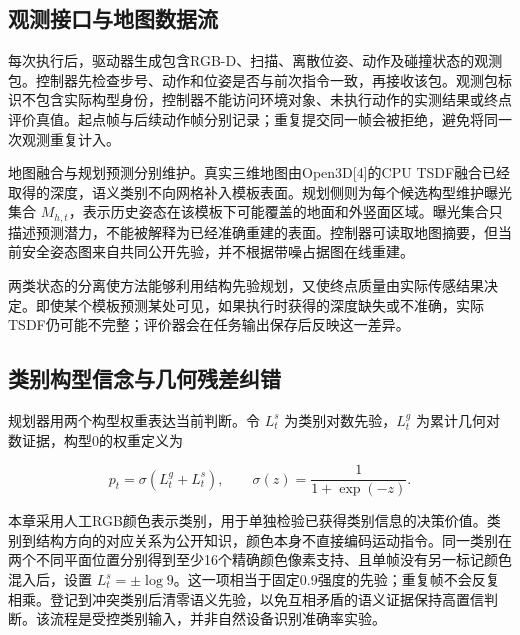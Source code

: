 \documentclass[11pt,a4paper]{article}
\numberwithin{equation}{section}
\begin{document}
\hypertarget{ux89c2ux6d4bux63a5ux53e3ux4e0eux5730ux56feux6570ux636eux6d41}{%
\subsection{观测接口与地图数据流}\label{ux89c2ux6d4bux63a5ux53e3ux4e0eux5730ux56feux6570ux636eux6d41}}

每次执行后，驱动器生成包含RGB-D、扫描、离散位姿、动作及碰撞状态的观测包。控制器先检查步号、动作和位姿是否与前次指令一致，再接收该包。观测包标识不包含实际构型身份，控制器不能访问环境对象、未执行动作的实测结果或终点评价真值。起点帧与后续动作帧分别记录；重复提交同一帧会被拒绝，避免将同一次观测重复计入。

地图融合与规划预测分别维护。真实三维地图由Open3D{[}4{]}的CPU TSDF融合已经取得的深度，语义类别不向网格补入模板表面。规划侧则为每个候选构型维护曝光集合 \(M_{h,t}\)，表示历史姿态在该模板下可能覆盖的地面和外竖面区域。曝光集合只描述预测潜力，不能被解释为已经准确重建的表面。控制器可读取地图摘要，但当前安全姿态图来自共同公开先验，并不根据带噪占据图在线重建。

两类状态的分离使方法能够利用结构先验规划，又使终点质量由实际传感结果决定。即使某个模板预测某处可见，如果执行时获得的深度缺失或不准确，实际TSDF仍可能不完整；评价器会在任务输出保存后反映这一差异。

\hypertarget{ux7c7bux522bux6784ux578bux4fe1ux5ff5ux4e0eux51e0ux4f55ux6b8bux5deeux7ea0ux9519}{%
\subsection{类别构型信念与几何残差纠错}\label{ux7c7bux522bux6784ux578bux4fe1ux5ff5ux4e0eux51e0ux4f55ux6b8bux5deeux7ea0ux9519}}

规划器用两个构型权重表达当前判断。令 \(L_t^s\) 为类别对数先验，\(L_t^g\) 为累计几何对数证据，构型0的权重定义为

\begin{equation}
p_t=\sigma(L_t^g+L_t^s),\qquad
\sigma(z)=\frac{1}{1+\exp(-z)}.
\end{equation}

本章采用人工RGB颜色表示类别，用于单独检验已获得类别信息的决策价值。类别到结构方向的对应关系为公开知识，颜色本身不直接编码运动指令。同一类别在两个不同平面位置分别得到至少16个精确颜色像素支持、且单帧没有另一标记颜色混入后，设置 \(L_t^s=\pm\log 9\)。这一项相当于固定0.9强度的先验；重复帧不会反复相乘。登记到冲突类别后清零语义先验，以免互相矛盾的语义证据保持高置信判断。该流程是受控类别输入，并非自然设备识别准确率实验。
\end{document}
